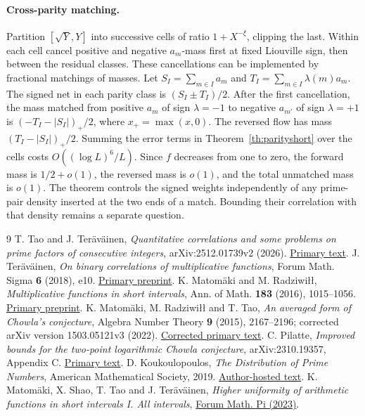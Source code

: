 \documentclass[11pt]{article}
\theoremstyle{remark}\newtheorem{remark}[theorem]{Remark}
\begin{document}
\paragraph{Cross-parity matching.}
Partition \([\sqrt Y,Y]\) into successive cells of ratio \(1+X^{-\xi}\),
clipping the last. Within each cell cancel positive and negative
\(a_m\)-mass first at fixed Liouville sign, then between the residual classes.
These cancellations can be implemented by fractional matchings of masses.
Let \(S_I=\sum_{m\in I}a_m\) and \(T_I=\sum_{m\in I}\lambda(m)a_m\).
The signed net in each parity class is \((S_I\pm T_I)/2\).
After the first cancellation, the mass matched from positive \(a_m\)
of sign \(\lambda=-1\) to negative \(a_{m'}\) of sign \(\lambda=+1\)
is \((-\!T_I-|S_I|)_+/2\), where \(x_+=\max(x,0)\). The reversed
flow has mass \((T_I-|S_I|)_+/2\). Summing the error terms in
Theorem~\ref{th:parityshort} over the cells costs
\(O((\log L)^6/L)\). Since \(f\) decreases from one to zero,
the forward mass is \(1/2+o(1)\), the reversed mass is \(o(1)\),
and the total unmatched mass is \(o(1)\).
The theorem controls the signed weights independently of any
prime-pair density inserted at the two ends of a match. Bounding
their correlation with that density remains a separate question.

\begin{thebibliography}{9}\small
{} T. Tao and J. Ter\"av\"ainen,
\emph{Quantitative correlations and some problems on prime factors of consecutive integers},
arXiv:2512.01739v2 (2026).
\href{https://arxiv.org/html/2512.01739v2}{Primary text}.
 J. Ter\"av\"ainen,
\emph{On binary correlations of multiplicative functions},
Forum Math. Sigma \textbf{6} (2018), e10.
\href{https://arxiv.org/html/1710.01195v2}{Primary preprint}.
 K. Matom\"aki and M. Radziwi\l\l,
\emph{Multiplicative functions in short intervals},
Ann. of Math. \textbf{183} (2016), 1015--1056.
\href{https://arxiv.org/html/1501.04585v3}{Primary preprint}.
 K. Matom\"aki, M. Radziwi\l\l{} and T. Tao,
\emph{An averaged form of Chowla's conjecture},
Algebra Number Theory \textbf{9} (2015), 2167--2196;
corrected arXiv version 1503.05121v3 (2022).
\href{https://arxiv.org/html/1503.05121v3}{Corrected primary text}.
 C. Pilatte,
\emph{Improved bounds for the two-point logarithmic Chowla conjecture},
arXiv:2310.19357, Appendix C.
\href{https://arxiv.org/html/2310.19357}{Primary text}.
 D. Koukoulopoulos,
\emph{The Distribution of Prime Numbers}, American Mathematical Society, 2019.
\href{https://dms.umontreal.ca/~koukoulo/documents/publications/primes.pdf}{Author-hosted text}.
K. Matom\"aki, X. Shao, T. Tao and J. Ter\"av\"ainen,
\emph{Higher uniformity of arithmetic functions in short intervals I.
All intervals}, \href{https://doi.org/10.1017/fmp.2023.28}{Forum Math. Pi (2023)}.
\end{thebibliography}
\end{document}
